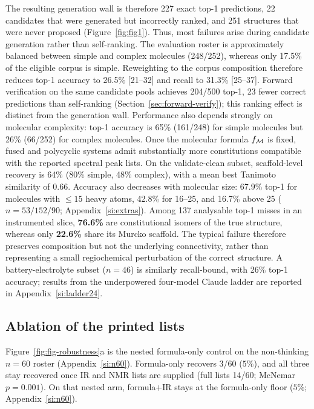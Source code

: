 \documentclass{article}
\begin{document}
The resulting generation wall is therefore 227 exact top-1 predictions, 22 candidates that were generated but incorrectly ranked, and 251 structures that were never proposed (Figure~\ref{fig:fig1}). Thus, most failures arise during candidate generation rather than self-ranking. The evaluation roster is approximately balanced between simple and complex molecules (248/252), whereas only 17.5\% of the eligible corpus is simple. Reweighting to the corpus composition therefore reduces top-1 accuracy to 26.5\% [21--32] and recall to 31.3\% [25--37]. Forward verification on the same candidate pools achieves 204/500 top-1, 23 fewer correct predictions than self-ranking (Section~\ref{sec:forward-verify}); this ranking effect is distinct from the generation wall. Performance also depends strongly on molecular complexity: top-1 accuracy is 65\% (161/248) for simple molecules but 26\% (66/252) for complex molecules. Once the molecular formula $f_{\cal M}$ is fixed, fused and polycyclic systems admit substantially more constitutions compatible with the reported spectral peak lists. On the validate-clean subset, scaffold-level recovery is 64\% (80\% simple, 48\% complex), with a mean best Tanimoto similarity of 0.66. Accuracy also decreases with molecular size: 67.9\% top-1 for molecules with $\leq 15$ heavy atoms, 42.8\% for 16--25, and 16.7\% above 25 ($n{=}53/152/90$; Appendix~\ref{si:extras}). Among 137 analysable top-1 misses in an instrumented slice, \textbf{76.6\%} are constitutional isomers of the true structure, whereas only \textbf{22.6\%} share its Murcko scaffold. The typical failure therefore preserves composition but not the underlying connectivity, rather than representing a small regiochemical perturbation of the correct structure. A battery-electrolyte subset ($n{=}46$) is similarly recall-bound, with 26\% top-1 accuracy; results from the underpowered four-model Claude ladder are reported in Appendix~\ref{si:ladder24}.

\subsection{Ablation of the printed lists}
\label{sec:contamination}

Figure~\ref{fig:fig-robustness}a is the nested formula-only control on the non-thinking $n{=}60$ roster (Appendix~\ref{si:n60}). Formula-only recovers 3/60 ($5\%$), and all three stay recovered once IR and NMR lists are supplied (full lists 14/60; McNemar $p{=}0.001$). On that nested arm, formula$+$IR stays at the formula-only floor ($5\%$; Appendix~\ref{si:n60}).
\end{document}
